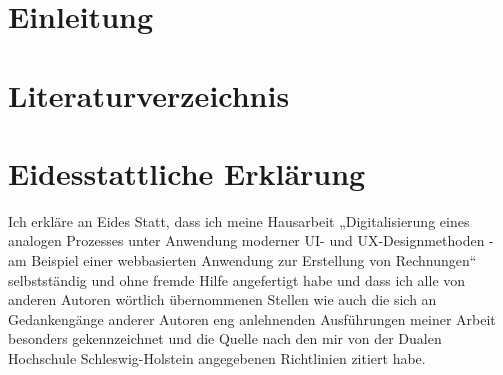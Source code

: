 \documentclass[a4paper]{scrartcl}
\begin{document}
\setcounter{page}{1}


\section{Einleitung}




\newpage


\setcounter{page}{6}


\section*{Literaturverzeichnis}

\singlespacing


\section*{Eidesstattliche Erklärung}


\onehalfspacing

Ich erkläre an Eides Statt, dass ich meine Hausarbeit „Digitalisierung eines analogen Prozesses unter Anwendung moderner UI- und UX-Designmethoden - am Beispiel einer webbasierten Anwendung zur Erstellung von Rechnungen“ selbstständig und ohne fremde Hilfe angefertigt habe und dass ich alle von anderen Autoren wörtlich übernommenen Stellen wie auch die sich an Gedankengänge anderer Autoren eng anlehnenden Ausführungen meiner Arbeit besonders gekennzeichnet und die Quelle nach den mir von der Dualen Hochschule Schleswig-Holstein angegebenen Richtlinien zitiert habe. \\ \\
\end{document}
